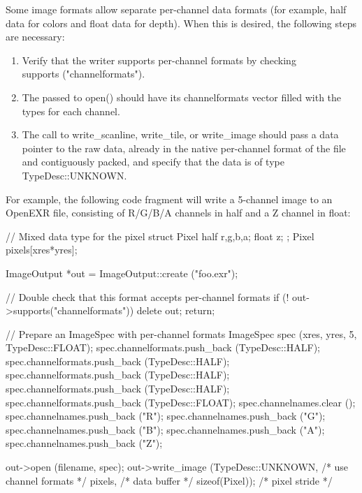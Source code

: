Some image formats allow separate per-channel data formats (for example,
{\cf half} data for colors and {\cf float} data for depth).  When this
is desired, the following steps are necessary:

\begin{enumerate}
\item Verify that the writer supports per-channel formats by checking \\
  {\cf supports ("channelformats")}.
\item The \ImageSpec passed to {\cf open()} should have its {\cf
  channelformats} vector filled with the types for each channel.
\item The call to {\cf write_scanline}, {\cf write_tile}, or {\cf
  write_image} should pass a {\cf data} pointer to the raw data, already
  in the native per-channel format of the file and contiguously packed,
  and specify that the data is of type {\cf TypeDesc::UNKNOWN}.
\end{enumerate}

For example, the following code fragment will write a 5-channel image
to an OpenEXR file, consisting of R/G/B/A channels in {\cf half} and
a Z channel in {\cf float}:

\begin{code}
        // Mixed data type for the pixel
        struct Pixel { half r,g,b,a; float z; };
        Pixel pixels[xres*yres];

        ImageOutput *out = ImageOutput::create ("foo.exr");

        // Double check that this format accepts per-channel formats
        if (! out->supports("channelformats")) {
            delete out;
            return;
        }

        // Prepare an ImageSpec with per-channel formats
        ImageSpec spec (xres, yres, 5, TypeDesc::FLOAT);
        spec.channelformats.push_back (TypeDesc::HALF);
        spec.channelformats.push_back (TypeDesc::HALF);
        spec.channelformats.push_back (TypeDesc::HALF);
        spec.channelformats.push_back (TypeDesc::HALF);
        spec.channelformats.push_back (TypeDesc::FLOAT);
        spec.channelnames.clear ();
        spec.channelnames.push_back ("R");
        spec.channelnames.push_back ("G");
        spec.channelnames.push_back ("B");
        spec.channelnames.push_back ("A");
        spec.channelnames.push_back ("Z");

        out->open (filename, spec);
        out->write_image (TypeDesc::UNKNOWN, /* use channel formats */
                          pixels,            /* data buffer */
                          sizeof(Pixel));    /* pixel stride */
\end{code}



